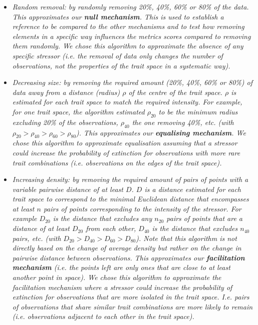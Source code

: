 \documentclass[
]{article}
\begin{document}
\begin{itemize}
\item \textit{Random removal: by randomly removing 20\%, 40\%, 60\% or 80\% of the data.
This approximates our \textbf{null mechanism}. This is used to establish a reference to be compared to the other mechanisms and to test how removing elements in a specific way influences the metrics scores compared to removing them randomly. We chose this algorithm to approximate the absence of any specific stressor (i.e. the removal of data only changes the number of observations, not the properties of the trait space in a systematic way).}

\item \textit{Decreasing size: by removing the required amount (20\%, 40\%, 60\% or 80\%) of data away from a distance (radius) $\rho$ of the centre of the trait space.
$\rho$ is estimated for each trait space to match the required intensity. For example, for one trait space, the algorithm estimated $\rho_{20}$ to be the minimum radius excluding 20\% of the observations, $\rho_{40}$ the one removing 40\%, etc. (with $\rho_{20} > \rho_{40} > \rho_{60} > \rho_{80}$).
This approximates our \textbf{equalising mechanism}. 
We chose this algorithm to approximate equalisation assuming that a stressor could increase the probability of extinction for observations with more rare trait combinations (i.e. observations on the edges of the trait space).}

\item \textit{Increasing density: by removing the required amount of pairs of points with a variable pairwise distance of at least $D$.
$D$ is a distance estimated for each trait space to correspond to the minimal Euclidean distance that encompasses at least $n$ pairs of points corresponding to the intensity of the stressor.
For example $D_{20}$ is the distance that excludes any $n_{20}$ pairs of points that are a distance of at least $D_{20}$ from each other, $D_{40}$ is the distance that excludes $n_{40}$ pairs, etc. (with $D_{20} > D_{40} > D_{60} > D_{80}$).
Note that this algorithm is not directly based on the change of average density but rather on the change in pairwise distance between observations.
This approximates our \textbf{facilitation mechanism} (i.e. the points left are only ones that are close to at least another point in space).
We chose this algorithm to approximate the facilitation mechanism where a stressor could increase the probability of extinction for observations that are more isolated in the trait space.
I.e. pairs of observations that share similar trait combinations are more likely to remain (i.e. observations adjacent to each other in the trait space).}


\end{itemize}
\end{document}
